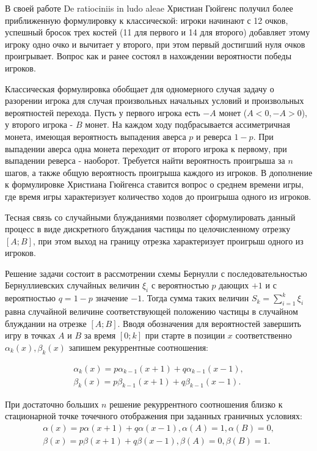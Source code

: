 В своей работе De ratiociniis in ludo aleae Христиан Гюйгенс получил более приближенную формулировку к классической: игроки начинают с 12 очков, успешный бросок 
трех костей (11 для первого и 14 для второго) добавляет этому игроку одно очко и вычитает у второго, при этом первый достигший нуля очков проигрывает.
Вопрос как и ранее состоял в нахождении вероятности победы игроков. 

Классическая формулировка обобщает для одномерного случая задачу о разорении игрока для случая произвольных начальных условий и произвольных вероятностей перехода. 
Пусть у первого игрока есть $-A$ монет ($A < 0, -A > 0$), у второго игрока - $B$ монет. На каждом ходу подбрасывается ассиметричная монета, имеющая вероятность выпадения 
аверса $p$ и реверса $1-p$. При выпадении аверса одна монета переходит от второго игрока к первому, при выпадении реверса - наоборот. Требуется найти вероятность проигрыша 
за $n$ шагов, а также общую вероятность проигрыша каждого из игроков. В дополнение к формулировке Христиана Гюйгенса ставится вопрос о среднем времени игры, 
где время игры характеризует количество ходов до проигрыша одного из игроков.

Тесная связь со случайными блужданиями позволяет сформулировать данный процесс в виде дискретного блуждания частицы по целочисленному отрезку $[A; B]$, 
при этом выход на границу отрезка характеризует проигрыш одного из игроков. 

Решение задачи состоит в рассмотрении схемы Бернулли с последовательностью Бернуллиевских случайных величин $\xi_i$ с вероятностью $p$ дающих $+1$ и 
с вероятностью $q=1-p$ значение $-1$.
Тогда сумма таких величин $S_k=\sum_{i=1}^{k} \xi_i$ равна случайной величине соответствующей положению частицы в случайном блуждании на отрезке $[A; B]$.
Вводя обозначения для вероятностей завершить игру в точках $A$ и $B$ за время $[0; k]$ при старте в позиции $x$ соответственно $\alpha_k(x), \beta_k(x)$ 
запишем рекуррентные соотношения:

\begin{equation}
    \label{eq:eq1}
    \begin{alignedat}{2}
        \alpha_k(x) = p\alpha_{k-1}(x+1)+q\alpha_{k-1}(x-1),\\
        \beta_k(x) = p\beta_{k-1}(x+1)+q\beta_{k-1}(x-1).
    \end{alignedat}
\end{equation}

При достаточно больших $n$ решение рекуррентного соотношения близко к стационарной точке точечного отображения при заданных граничных условиях:
\begin{equation}
    \label{eq:eq2}
    \begin{alignedat}{2}
        \alpha(x) = p\alpha(x+1)+q\alpha(x-1), \alpha(A)=1, \alpha(B)=0,\\
        \beta(x) = p\beta(x+1)+q\beta(x-1), \beta(A)=0, \beta(B)=1.
    \end{alignedat}
\end{equation}

